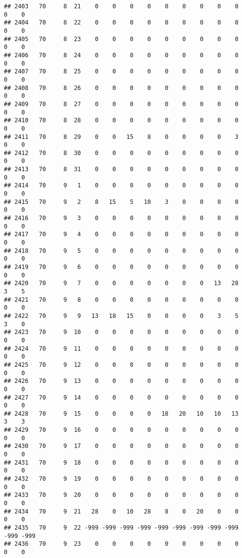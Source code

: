 \documentclass[]{article}
\begin{document}
\begin{verbatim}
## 2403   70     8  21    0    0    0    0    0    0    0    0    0    0    0
## 2404   70     8  22    0    0    0    0    0    0    0    0    0    0    0
## 2405   70     8  23    0    0    0    0    0    0    0    0    0    0    0
## 2406   70     8  24    0    0    0    0    0    0    0    0    0    0    0
## 2407   70     8  25    0    0    0    0    0    0    0    0    0    0    0
## 2408   70     8  26    0    0    0    0    0    0    0    0    0    0    0
## 2409   70     8  27    0    0    0    0    0    0    0    0    0    0    0
## 2410   70     8  28    0    0    0    0    0    0    0    0    0    0    0
## 2411   70     8  29    0    0   15    8    0    0    0    0    3    0    0
## 2412   70     8  30    0    0    0    0    0    0    0    0    0    0    0
## 2413   70     8  31    0    0    0    0    0    0    0    0    0    0    0
## 2414   70     9   1    0    0    0    0    0    0    0    0    0    0    0
## 2415   70     9   2    8   15    5   10    3    0    0    0    0    0    0
## 2416   70     9   3    0    0    0    0    0    0    0    0    0    0    0
## 2417   70     9   4    0    0    0    0    0    0    0    0    0    0    0
## 2418   70     9   5    0    0    0    0    0    0    0    0    0    0    0
## 2419   70     9   6    0    0    0    0    0    0    0    0    0    0    0
## 2420   70     9   7    0    0    0    0    0    0    0   13   28    3    5
## 2421   70     9   8    0    0    0    0    0    0    0    0    0    0    0
## 2422   70     9   9   13   18   15    0    0    0    0    3    5    3    0
## 2423   70     9  10    0    0    0    0    0    0    0    0    0    0    0
## 2424   70     9  11    0    0    0    0    0    0    0    0    0    0    0
## 2425   70     9  12    0    0    0    0    0    0    0    0    0    0    0
## 2426   70     9  13    0    0    0    0    0    0    0    0    0    0    0
## 2427   70     9  14    0    0    0    0    0    0    0    0    0    0    0
## 2428   70     9  15    0    0    0    0   18   20   10   10   13    3    3
## 2429   70     9  16    0    0    0    0    0    0    0    0    0    0    0
## 2430   70     9  17    0    0    0    0    0    0    0    0    0    0    0
## 2431   70     9  18    0    0    0    0    0    0    0    0    0    0    0
## 2432   70     9  19    0    0    0    0    0    0    0    0    0    0    0
## 2433   70     9  20    0    0    0    0    0    0    0    0    0    0    0
## 2434   70     9  21   28    0   10   28    8    0   20    0    0    0    0
## 2435   70     9  22 -999 -999 -999 -999 -999 -999 -999 -999 -999 -999 -999
## 2436   70     9  23    0    0    0    0    0    0    0    0    0    0    0

\end{verbatim}
\end{document}
